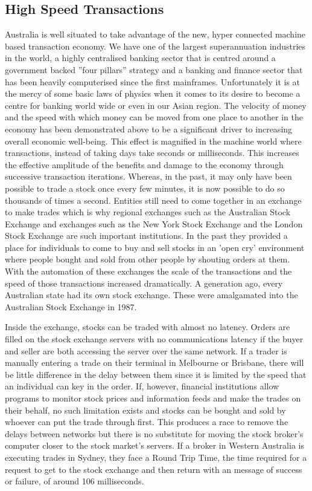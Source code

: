 \subsection{High Speed Transactions}

Australia is well situated to take advantage of the new, hyper connected machine based transaction economy. We have one of the largest superannuation industries in the world, a highly centralised banking sector that is centred around a government backed ''four pillars'' strategy and a banking and finance sector that has been heavily computerised since the first mainframes. Unfortunately it is at the mercy of some basic laws of physics when it comes to its desire to become a centre for banking world wide or even in our Asian region. The velocity of money and the speed with which money can be moved from one place to another in the economy has been demonstrated above to be a significant driver to increasing overall economic well-being. This effect is magnified in the machine world where transactions, instead of taking days take seconds or milliseconds. This increases the effective amplitude of the benefits and damage to the economy through successive transaction iterations. Whereas, in the past, it may only have been possible to trade a stock once every few minutes, it is now possible to do so thousands of times a second. Entities still need to come together in an exchange to make trades which is why regional exchanges such as the Australian Stock Exchange and exchanges such as the New York Stock Exchange and the London Stock Exchange are such important institutions. In the past they provided a place for individuals to come to buy and sell stocks in an 'open cry' environment where people bought and sold from other people by shouting orders at them. With the automation of these exchanges the scale of the transactions and the speed of those transactions increased dramatically. A generation ago, every Australian state had its own stock exchange. These were amalgamated into the Australian Stock Exchange in 1987\cite{RefWorks:258}.

Inside the exchange, stocks can be traded with almost no latency. Orders are filled on the stock exchange servers with no communications latency if the buyer and seller are both accessing the server over the same network. If a trader is manually entering a trade on their terminal in Melbourne or Brisbane, there will be little difference in the delay between them since it is limited by the speed that an individual can key in the order. If, however, financial institutions allow programs to monitor stock prices and information feeds and make the trades on their behalf, no such limitation exists and stocks can be bought and sold by whoever can put the trade through first. This produces a race to remove the delays between networks but there is no substitute for moving the stock broker's computer closer to the stock market's servers. If a broker in Western Australia is executing trades in Sydney, they face a Round Trip Time, the time required for a request to get to the stock exchange and then return with an message of success or failure, of  around 106 milliseconds. 

